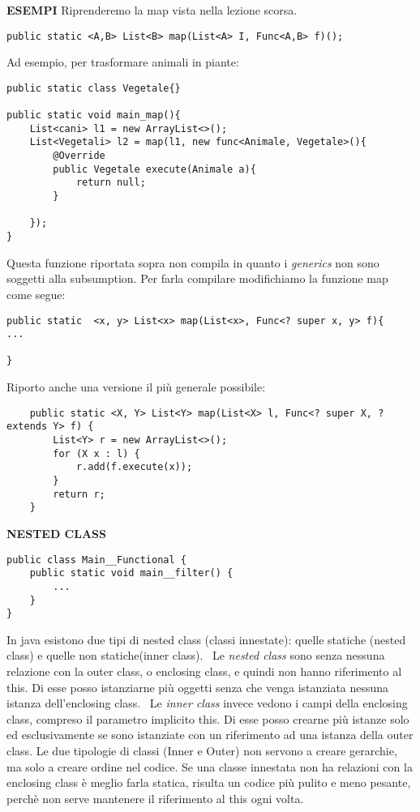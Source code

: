 \noindent \textbf{ESEMPI} \newline
\noindent Riprenderemo la map vista nella lezione scorsa.
\begin{lstlisting}
public static <A,B> List<B> map(List<A> I, Func<A,B> f)();
\end{lstlisting}
Ad esempio, per trasformare animali in piante: 
\begin{lstlisting}
public static class Vegetale{}

public static void main_map(){
	List<cani> l1 = new ArrayList<>();
	List<Vegetali> l2 = map(l1, new func<Animale, Vegetale>(){
		@Override
		public Vegetale execute(Animale a){
			return null;
		}
	
	});
}
\end{lstlisting}
\noindent Questa funzione riportata sopra non compila in quanto i \textit{generics} non sono soggetti alla subsumption. Per farla compilare modifichiamo la funzione map come segue: 

\begin{lstlisting}
public static  <x, y> List<x> map(List<x>, Func<? super x, y> f){
...

}
\end{lstlisting}

\noindent Riporto anche una versione il più generale possibile: \newline

\begin{lstlisting}
    public static <X, Y> List<Y> map(List<X> l, Func<? super X, ? extends Y> f) {
        List<Y> r = new ArrayList<>();
        for (X x : l) {
            r.add(f.execute(x));
        }
        return r;
    } 
\end{lstlisting}

\noindent \textbf{NESTED CLASS}\newline
\begin{lstlisting}
public class Main__Functional {
	public static void main__filter() {
		...
	}
}
\end{lstlisting}
In java esistono due tipi di nested class (classi innestate): quelle statiche (nested class) e quelle non statiche(inner class).\newline
\textbullet\ Le \textit{nested class} sono senza nessuna relazione con la outer class, o enclosing class, e quindi non hanno riferimento al this. Di esse posso istanziarne più oggetti senza che venga istanziata nessuna istanza dell'enclosing class. \newline
\textbullet\ Le \textit{inner class} invece vedono i campi della enclosing class, compreso il parametro implicito this. Di esse posso crearne più istanze solo ed esclusivamente se sono istanziate con un riferimento ad una istanza della outer class. \newline
Le due tipologie di classi (Inner e Outer) non servono a creare gerarchie, ma solo a creare ordine nel codice.\newline
Se una classe innestata non ha relazioni con la enclosing class è meglio farla statica, risulta un codice più pulito e meno pesante, perchè non serve mantenere il riferimento al this ogni volta.

